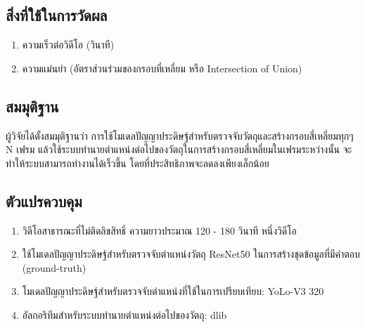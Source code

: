 \subsection*{สิ่งที่ใช้ในการวัดผล}
	\begin{enumerate}
		\item ความเร็วต่อวิดีโอ (วินาที)
		\item ความแม่นยำ (อัตราส่วนร่วมของกรอบที่เหลี่ยม หรือ Intersection of Union)
	\end{enumerate}
\subsection*{สมมุติฐาน}
ผู้วิจัยได้ตั้งสมมุติฐานว่า การใช้โมเดลปัญญาประดิษฐ์สำหรับตรวจจับวัตถุและสร้างกรอบสี่เหลี่ยมทุกๆ N เฟรม 
แล้วใช้ระบบทำนายตำแหน่งต่อไปของวัตถุในการสร้างกรอบสี่เหลี่ยมในเฟรมระหว่างนั้น จะทำให้ระบบสามารถทำงานได้เร็วขึ้น โดยที่ประสิทธิภาพจะลดลงเพียงเล็กน้อย
\subsection*{ตัวแปรควบคุม}
	\begin{enumerate}
		\item วิดีโอสาธารณะที่ไม่ติดลิขสิทธิ์ ความยาวประมาณ 120 - 180 วินาที หนึ่งวิดีโอ
		\item ใช้โมเดลปัญญาประดิษฐ์สำหรับตรวจจับตำแหน่งวัตถุ ResNet50 ในการสร้างชุดข้อมูลที่มีคำตอบ (ground-truth)
		\item โมเดลปัญญาประดิษฐ์สำหรับตรวจจับตำแหน่งที่ใช้ในการเปรียบเทียบ: YoLo-V3 320
		\item อัลกอริทึมสำหรับระบบทำนายตำแหน่งต่อไปของวัตถุ: dlib
	\end{enumerate}
